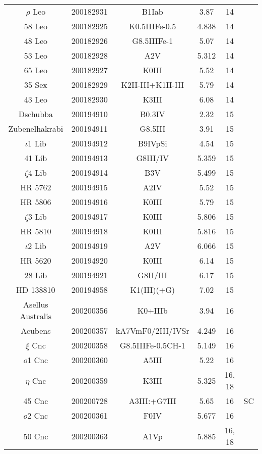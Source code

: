 \begin{table*}
\begin{tabular}{cccccc}
$\rho$ Leo & 200182931 & B1Iab & 3.87 & 14 & \citet{Aerts2018} \\
58 Leo & 200182925 & K0.5IIIFe-0.5 & 4.838 & 14 &  \\
48 Leo & 200182926 & G8.5IIIFe-1 & 5.07 & 14 &  \\
53 Leo & 200182928 & A2V & 5.312 & 14 &  \\
65 Leo & 200182927 & K0III & 5.52 & 14 &  \\
35 Sex & 200182929 & K2II-III+K1II-III & 5.79 & 14 &  \\
43 Leo & 200182930 & K3III & 6.08 & 14 &  \\
Dschubba & 200194910 & B0.3IV & 2.32 & 15 &  \\
Zubenelhakrabi & 200194911 & G8.5III & 3.91 & 15 &  \\
$\iota$1 Lib & 200194912 & B9IVpSi & 4.54 & 15 & \citet{Buysschaert2018} \\
41 Lib & 200194913 & G8III/IV & 5.359 & 15 &  \\
$\zeta$4 Lib & 200194914 & B3V & 5.499 & 15 &  \\
HR 5762 & 200194915 & A2IV & 5.52 & 15 &  \\
HR 5806 & 200194916 & K0III & 5.79 & 15 &  \\
$\zeta$3 Lib & 200194917 & K0III & 5.806 & 15 &  \\
HR 5810 & 200194918 & K0III & 5.816 & 15 &  \\
$\iota$2 Lib & 200194919 & A2V & 6.066 & 15 & \citet{Buysschaert2018} \\
HR 5620 & 200194920 & K0III & 6.14 & 15 &  \\
28 Lib & 200194921 & G8II/III & 6.17 & 15 &  \\
HD 138810 & 200194958 & K1(III)(+G) & 7.02 & 15 &  \\
Asellus Australis & 200200356 & K0+IIIb & 3.94 & 16 &  \\
Acubens & 200200357 & kA7VmF0/2III/IVSr & 4.249 & 16 &  \\
$\xi$ Cnc & 200200358 & G8.5IIIFe-0.5CH-1 & 5.149 & 16 &  \\
$o$1 Cnc & 200200360 & A5III & 5.22 & 16 &  \\
$\eta$ Cnc & 200200359 & K3III & 5.325 & 16, 18 &  \\
45 Cnc & 200200728 & A3III:+G7III & 5.65 & 16 & SC \\
$o$2 Cnc & 200200361 & F0IV & 5.677 & 16 &  \\
50 Cnc & 200200363 & A1Vp & 5.885 & 16, 18 &  \\

\end{tabular}
\end{table*}
